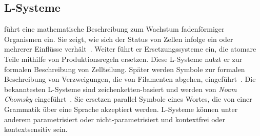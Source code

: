 \subsection*{L-Systeme}
\citeauthor{lindemayer_1968} führt eine mathematische Beschreibung zum Wachstum fadenförmiger Organismen ein.
Sie zeigt, wie sich der Status von Zellen infolge ein oder mehrerer Einflüsse verhält~\cite{lindemayer_1968}.
Weiter führt er Ersetzungssysteme ein, die atomare Teile mithilfe von Produktionsregeln ersetzen.
Diese L-Systeme nutzt er zur formalen Beschreibung von Zellteilung.
Später werden Symbole zur formalen Beschreibung von Verzweigungen, die von Filamenten abgehen, eingeführt~\cite{prusinkiewicz_1990}.
Die bekanntesten L-Systeme sind zeichenketten-basiert und werden von \textit{Noam Chomsky} eingeführt~\cite{chomsky_1956}.
Sie ersetzen parallel Symbole eines Wortes, die von einer Grammatik über eine Sprache akzeptiert werden.
L-Systeme können unter anderem parametrisiert oder nicht-parametrisiert und kontextfrei oder kontextsensitiv sein.

